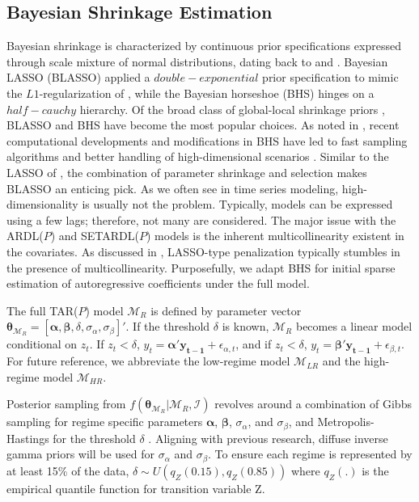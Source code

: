 \subsection{Bayesian Shrinkage Estimation}
Bayesian shrinkage is characterized by continuous prior specifications expressed through scale mixture of normal distributions, dating back to\cite{Andrews1974} and \cite{West1987}.  Bayesian LASSO (BLASSO) \citep{Yuan2005,Park2008,Hans2009,Hans2010,Rajaratnam2015} applied a $double-exponential$ prior specification to mimic the $L1$-regularization of \cite{Tibshirani1994}, while the Bayesian horseshoe (BHS)  \cite{Carvalho2009,Carvalho2010} hinges on a $half-cauchy$ hierarchy.  Of the broad class of global-local shrinkage priors \citep{Polson2010}, BLASSO and BHS have become the most popular choices. As noted in \cite{Bhadra2017}, recent computational developments and modifications in BHS have led to fast sampling algorithms and better handling of high-dimensional scenarios \citep{Bhadra2016,Makalic2016b}.  Similar to the LASSO of \cite{Tibshirani1994}, the combination of parameter shrinkage and selection makes BLASSO an enticing pick. As we often see in time series modeling, high-dimensionality is usually not the problem. Typically, models can be expressed using a few lags; therefore, not many are considered. The major issue with the ARDL($P$) and SETARDL($P$) models is the inherent multicollinearity existent in the covariates. As discussed in \cite{Friedman2001,Zou2005,Mallick2013}, LASSO-type penalization typically stumbles in the presence of multicollinearity. Purposefully, we adapt BHS for initial sparse estimation of autoregressive coefficients under the full model.

The full TAR($P$) model $\mathcal{M}_R$ is defined by parameter vector $\bm{\theta}_{\mathcal{M}_R}=[\bm{\alpha},\bm{\beta},\delta,\sigma_\alpha,\sigma_\beta]'$. If the threshold $\delta$ is known, $\mathcal{M}_R$ becomes a linear model conditional on $z_t$. If $z_t<\delta$, $y_t=\bm{\alpha}'\bm{y_{t-1}}+\epsilon_{\alpha,t}$, and if $z_t<\delta$, $y_t=\bm{\beta}'\bm{y_{t-1}}+\epsilon_{\beta,t}$. For future reference, we abbreviate the low-regime model $\mathcal{M}_{LR}$ and the high-regime model $\mathcal{M}_{HR}$.

Posterior sampling from $f(\bm{\theta}_{\mathcal{M}_R}|\mathcal{M}_R,\mathcal{I})$ revolves around a combination of Gibbs sampling \citep{Gelfand1990} for regime specific parameters $\bm{\alpha}$, $\bm{\beta}$, $\sigma_\alpha$, and $\sigma_\beta$, and Metropolis-Hastings \citep{Metropolis1953,Hastings1970} for the threshold $\delta$  \citep{Geweke1993,Chen1998,Koop1999,Campbell2004}. Aligning with previous research, diffuse inverse gamma priors will be used for $\sigma_\alpha$ and $\sigma_\beta$. To ensure each regime is represented by at least 15\% of the data, $\delta\sim U(q_{Z}(0.15),q_Z(0.85))$ where $q_Z(.)$ is the empirical quantile function for transition variable Z.

